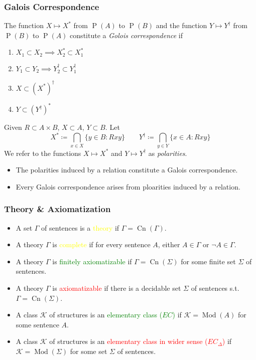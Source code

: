 \documentclass[UTF8,11pt,colorlinks,compress,openany]{beamer}%
\begin{document}
\begin{frame}\frametitle{Galois Correspondence}
\setlength\abovedisplayskip{0pt}
\setlength\belowdisplayskip{0pt}
\begin{definition}
The function $X\mapsto X^*$ from $\operatorname{P}(A)$ to $\operatorname{P}(B)$ and the function $Y\mapsto Y^\dagger$ from $\operatorname{P}(B)$ to $\operatorname{P}(A)$ constitute a \emph{Golois correspondence} if
\begin{enumerate}
	\item $X_1\subset X_2\implies X_2^*\subset X_1^*$
	\item $Y_1\subset Y_2\implies Y_2^\dagger\subset Y_1^\dagger$
	\item $X\subset(X^*)^\dagger$
	\item $Y\subset(Y^\dagger)^*$
\end{enumerate}
\end{definition}
\begin{definition}[Polarity]
Given $R\subset A\times B$, $X\subset A$, $Y\subset B$. Let
\[X^*\coloneqq \bigcap_{x\in X}\{y\in B: Rxy\}\qquad Y^\dagger\coloneqq \bigcap_{y\in Y}\{x\in A: Rxy\}\]
We refer to the functions $X\mapsto X^*$ and $Y\mapsto Y^\dagger$ as \emph{polarities}.
\end{definition}
\begin{itemize}\small
	\item The polarities induced by a relation constitute a Galois correspondence.
	\item Every Galois correspondence arises from ploarities induced by a relation.
\end{itemize}
\end{frame}

\begin{frame}\frametitle{Theory \& Axiomatization}
	\begin{itemize}
		\item A set $\Gamma$ of sentences is a \textcolor{yellow}{theory} if $\Gamma=\operatorname{Cn}(\Gamma)$.
		\item A theory $\Gamma$ is \textcolor{yellow}{complete} if for every sentence $A$, either $A\in\Gamma$ or $\neg A\in\Gamma$.
		\item A theory $\Gamma$ is \textcolor{green}{finitely axiomatizable} if $\Gamma=\operatorname{Cn}(\Sigma)$ for some finite set $\Sigma$ of sentences.
		\item A theory $\Gamma$ is \textcolor{red}{axiomatizable} if there is a decidable set $\Sigma$ of sentences s.t. $\Gamma=\operatorname{Cn}(\Sigma)$.
		\item A class $\mathcal{K}$ of structures is an \textcolor{green}{elementary class ($EC$)} if $\mathcal{K}=\operatorname{Mod}(A)$ for some sentence $A$.
		\item A class $\mathcal{K}$ of structures is an \textcolor{red}{elementary class in wider sense ($EC_\Delta$)} if $\mathcal{K}=\operatorname{Mod}(\Sigma)$ for some set $\Sigma$ of sentences.
	\end{itemize}
\end{frame}
\end{document}
